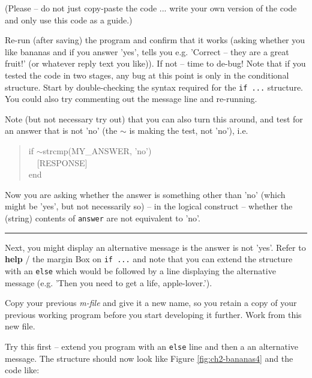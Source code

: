 \documentclass{tufte-book} %
\newenvironment{docspec}{\begin{quotation}\ttfamily\parskip0pt\parindent0pt\ignorespaces}{\end{quotation}}
\begin{document}
\noindent(Please -- do not just copy-paste the code ... write your own version of the code and only use this code as a guide.)

Re-run (after saving) the program and confirm that it works (asking whether you like bananas and if you answer 'yes', tells you e.g. 'Correct -- they are a great fruit!' (or whatever reply text you like)). If not -- time to de-bug! Note that if you tested the code in two stages, any bug at this point is only in the conditional structure. Start by double-checking the syntax required for the \texttt{if ...} structure. You could also try commenting out the message line and re-running.

Note (but not necessary try out) that you can also turn this around, and test for an answer that is not 'no' (the \(\sim\) is making the test, not 'no'), i.e.

\begin{docspec}
if \(\sim\)strcmp(MY\_ANSWER, 'no')
\\ \ \ [RESPONSE]
\\end
\end{docspec}

\noindent Now you are asking whether the answer is something other than 'no' (which might be 'yes', but not necessarily so) -- in the logical construct -- whether the (string) contents of \texttt{answer} are not equivalent to 'no'.

\vspace{1mm}
\noindent\rule{2cm}{0.5pt}
\vspace{2mm}

\noindent Next, you might display an alternative message is the answer is not 'yes'. Refer to \textbf{help} / the margin Box on \texttt{if ...} and note that you can extend the structure with an \texttt{else} which would be followed by a line displaying the alternative message (e.g. 'Then you need to get a life, apple-lover.').


Copy your previous \textit{m-file} and give it a new name, so you retain a copy of your previous working program before you start developing it further. Work from this new file.

Try this first -- extend you program with an \texttt{else} line and then a an alternative message. The structure should now look like Figure \ref{fig:ch2-bananas4} and the code like:
\end{document}
